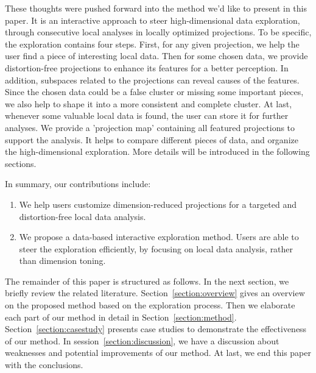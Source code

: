 These thoughts were pushed forward into the method we'd like to present in this paper. It is an interactive approach to steer high-dimensional data exploration, through consecutive local analyses in locally optimized projections. To be specific, the exploration contains four steps. First, for any given projection, we help the user find a piece of interesting local data. Then for some chosen data, we provide distortion-free projections to enhance its features for a better perception. In addition, subspaces related to the projections can reveal causes of the features. Since the chosen data could be a false cluster or missing some important pieces, we also help to shape it into a more consistent and complete cluster. At last, whenever some valuable local data is found, the user can store it for further analyses. We provide a 'projection map' containing all featured projections to support the analysis. It helps to compare different pieces of data, and organize the high-dimensional exploration. More details will be introduced in the following sections.

In summary, our contributions include:
\begin{enumerate}[(1)]
\item We help users customize dimension-reduced projections for a targeted and distortion-free local data analysis.
\item We propose a data-based interactive exploration method. Users are able to steer the exploration efficiently, by focusing on local data analysis, rather than dimension toning.
\end{enumerate}

The remainder of this paper is structured as follows. In the next section, we briefly review the related literature. Section~\ref{section:overview} gives an overview on the proposed method based on the exploration process. Then we elaborate each part of our method in detail in Section~\ref{section:method}. Section~\ref{section:casestudy} presents case studies to demonstrate the effectiveness of our method. In session~\ref{section:discussion}, we have a discussion about weaknesses and potential improvements of our method. At last, we end this paper with the conclusions.

